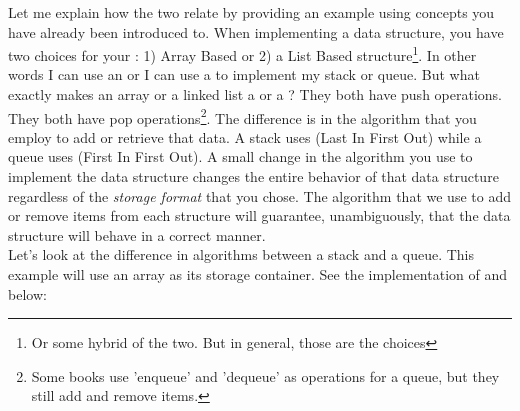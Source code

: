 Let me explain how the two relate by providing an example using concepts you have already been introduced to. When implementing a data structure, you have two choices for your : 1) Array Based or 2) a List Based structure\footnote{Or some hybrid of the two. But in general, those are the choices}. In other words I can use an  or I can use a  to implement my stack or queue. But what exactly makes an array or a linked list a  or a ? They both have push operations. They both have pop operations\footnote{Some books use 'enqueue' and 'dequeue' as operations for a queue, but they still add and remove items.}. The difference is in the algorithm that you employ to add or retrieve that data. A stack uses  (Last In First Out) while a queue uses  (First In First Out). A small change in the algorithm you use to implement the data structure changes the entire behavior of that data structure regardless of the \textit{storage format} that you chose. The algorithm that we use to add or remove items from each structure will guarantee, unambiguously, that the data structure will behave in a correct manner. \\

Let's look at the difference in algorithms between a stack and a queue. This example will use an array as its storage container. See the implementation of  and  below: \\

